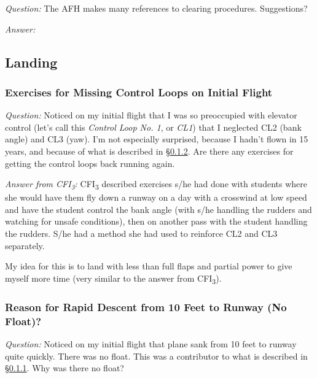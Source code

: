 \documentclass[letterpaper,10pt,titlepage]{article}
\begin{document}
\emph{Question:} The AFH makes many references to clearing procedures.  Suggestions?

\noindent{}\emph{Answer:}


\subsection{Landing}
\label{sqsa0:slnd0}


\subsubsection{Exercises for Missing Control Loops on Initial Flight}
\label{sqsa0:slnd0:slhy0}

\emph{Question:} Noticed on my initial flight that I was so preoccupied with
elevator control (let's call this \emph{Control Loop No. 1}, or \emph{CL1})
that I neglected CL2 (bank angle) and CL3 (yaw).  I'm not especially surprised,
because I hadn't flown in 15 years, and because of what is described in
\S{}\ref{sqsa0:slnd0:srdf0}.  Are there any exercises for getting the control loops
back running again.

\noindent{}\emph{Answer from CFI\textsubscript{3}:}
CFI\textsubscript{3} described exercises s/he had done with students where she
would have them fly down a runway on a day with a crosswind at low speed and
have the student control the bank angle (with s/he
handling the rudders and watching for unsafe conditions), then on another
pass with the student handling the rudders.  S/he had a method she had used
to reinforce CL2 and CL3 separately.

My idea for this is to land with less than full flaps and partial power to give
myself more time (very similar to the answer from CFI\textsubscript{3}).



\subsubsection{Reason for Rapid Descent from 10 Feet to Runway (No Float)?}
\label{sqsa0:slnd0:srdf0}

\emph{Question:} Noticed on my initial flight that plane sank from 10 feet
to runway quite quickly.  There was no float.  This was a contributor to
what is described in \S{}\ref{sqsa0:slnd0:slhy0}.  Why was there no float?
\end{document}
